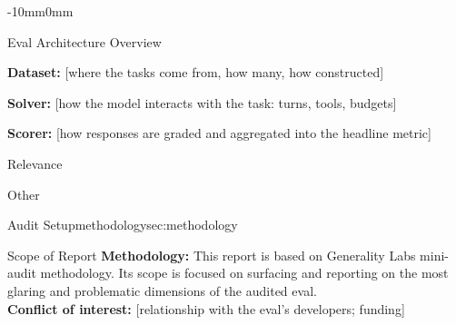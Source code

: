 \begin{maincontentstyled}
\begin{adjustwidth}{-10mm}{0mm}
\begin{dsbox}[breakable, title after break={EVAL ARCHITECTURE OVERVIEW CONT.}]{Eval Architecture Overview}
%
\noindent
[diagram]
\smallskip

\noindent\textbf{Dataset:} [where the tasks come from, how many, how
constructed]\par\smallskip
\noindent\textbf{Solver:} [how the model interacts with the task: turns,
tools, budgets]\par\smallskip
\noindent\textbf{Scorer:} [how responses are graded and aggregated into
the headline metric]
\end{dsbox}

\begin{dsbox}{Relevance}
\end{dsbox}

\begin{dsbox}{Other}
\end{dsbox}

\end{adjustwidth}

\begin{reportpart}{Audit Setup}{methodology}{sec:methodology}

\noindent
\begin{dsbox}[top=1mm, bottom=1mm, before skip=3pt, after skip=3pt]{Scope of Report}
\textbf{Methodology:} This report is based on Generality Labs mini-audit
methodology. Its scope is focused on surfacing and reporting on the most
glaring and problematic dimensions of the audited eval. \\
\textbf{Conflict of interest:} [relationship with the eval's developers;
funding]
\end{dsbox}


\end{reportpart}
\end{maincontentstyled}
